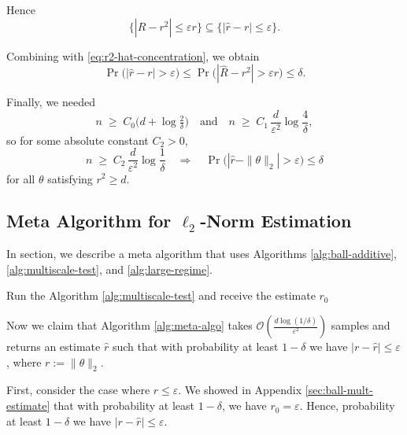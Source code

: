 Hence
\[
\big\{|\widehat{R} - r^2| \le \varepsilon r\big\}
\subseteq
\big\{|\hat r - r| \le \varepsilon\big\}.
\]

Combining with \eqref{eq:r2-hat-concentration}, we obtain
\[
\Pr\big(|\hat r - r| > \varepsilon\big)
\le \Pr\big(|\widehat{R} - r^2| > \varepsilon r\big)
\le \delta.
\]

Finally, we needed
\[
n \;\ge\; C_0\big(d + \log\tfrac{2}{\delta}\big)
\quad\text{and}\quad
n \;\ge\; C_1\,\frac{d}{\varepsilon^2}\log\frac{4}{\delta},
\]
so for some absolute constant $C_2>0$,
\[
n \;\ge\; C_2\,\frac{d}{\varepsilon^2}\log\frac{1}{\delta}
\quad\Longrightarrow\quad
\Pr\big(|\hat r - \|\theta\|_2| > \varepsilon\big)\le \delta
\]
for all $\theta$ satisfying $r^2 \ge d$.

\subsection{Meta Algorithm for $\ell_2$-Norm Estimation}\label{sec:ball-meta-algo}
In section, we describe a meta algorithm that uses Algorithms \ref{alg:ball-additive}, \ref{alg:multiscale-test}, and \ref{alg:large-regime}.

\begin{algorithm2e}[H]
\caption{Meta-algorithm to estimate $\|\theta\|_2^2$}
\label{alg:meta-algo}
\DontPrintSemicolon
{}
\LinesNumbered
{}
\BlankLine
Run the Algorithm \ref{alg:multiscale-test} and receive the estimate $r_0$\;
\end{algorithm2e}

Now we claim that Algorithm \ref{alg:meta-algo} takes $\mathcal{O}\left(\frac{d\log(1/\delta)}{\varepsilon^2}\right)$ samples and returns an estimate $\hat{r}$ such that with probability at least $1-\delta$ we have $|r-\hat r|\leq \varepsilon$, where $r:=\|\theta\|_2$. 

First, consider the case where $r\leq \varepsilon$. We showed in Appendix \ref{sec:ball-mult-estimate} that with probability at least $1-\delta$, we have $r_0=\varepsilon$. Hence, probability at least $1-\delta$ we have $|r-\hat r|\leq \varepsilon$.

